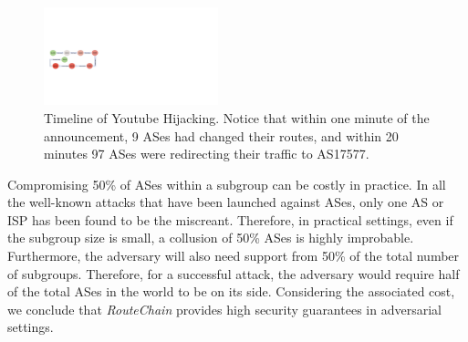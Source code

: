 \documentclass[conference]{IEEEtran}
\newcommand{\rc}{{{\em RouteChain}}\xspace}
\begin{document}
\begin{figure}[t]
\begin{center}
\includegraphics[width=0.45\textwidth]{fig/123.pdf}
\caption{Timeline of Youtube Hijacking. Notice that within one minute of the announcement, 9 ASes had changed their routes, and within 20 minutes 97 ASes were redirecting their traffic to AS17577.} 
\label{fig:YThijack}
\end{center}
\end{figure}

Compromising 50\% of ASes within a subgroup can be costly in practice. In all the well-known attacks that have been launched against ASes, only one AS or ISP has been found to be the miscreant. Therefore, in practical settings, even if the subgroup size is small, a collusion of 50\% ASes is highly improbable. Furthermore, the adversary will also need support from 50\% of the total number of subgroups. Therefore, for a successful attack, the adversary would require half of the total ASes in the world to be on its side. Considering the associated cost, we conclude that \rc provides high security guarantees in adversarial settings.  



\end{document}
